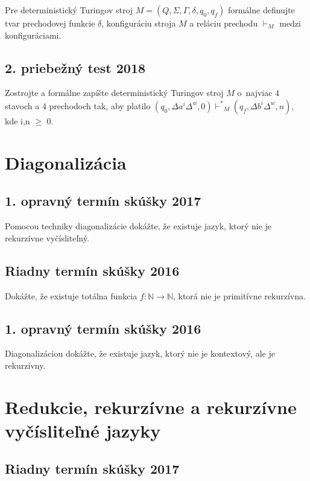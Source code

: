 \documentclass[11pt,a4paper]{article}
\begin{document}
		Pre deterministický Turingov stroj $M = (Q, \Sigma, \Gamma, \delta, q_0, q_f)$ formálne definujte tvar prechodovej funkcie $\delta$, konfiguráciu stroja $M$ a reláciu prechodu $\vdash_M$ medzi konfiguráciami.

		\subsection{2. priebežný test 2018}

		Zostrojte a formálne zapíšte deterministický Turingov stroj $M$ o~najviac 4 stavoch a 4 prechodoch tak, aby platilo $(q_0, \Delta a^i\Delta^w, 0) {\vdash^*}_M (q_f, \Delta b^i\Delta^w, n)$, kde i,n $\geq$ 0.

	\section{Diagonalizácia}

		\subsection{1. opravný termín skúšky 2017}

		Pomocou techniky diagonalizácie dokážte, že existuje jazyk, ktorý nie je rekurzívne vyčísliteľný.

		\subsection{Riadny termín skúšky 2016}

		Dokážte, že existuje totálna funkcia $f: \mathbb{N} \rightarrow \mathbb{N}$, ktorá nie je primitívne rekurzívna.

		\subsection{1. opravný termín skúšky 2016}

		Diagonalizáciou dokážte, že existuje jazyk, ktorý nie je kontextový, ale je rekurzívny.

	\section{Redukcie, rekurzívne a rekurzívne vyčísliteľné jazyky}

		\subsection{Riadny termín skúšky 2017}
\end{document}
